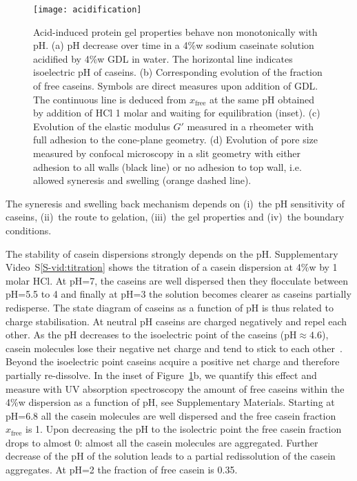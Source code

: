 \documentclass[twocolumn,superscriptaddress,showpacs,preprintnumbers, amsmath,amssymb,prl]{revtex4-1}
\begin{document}
\begin{figure}
	\texttt{[image: acidification]}%
	\caption{Acid-induced protein gel properties behave non monotonically with pH. (a) pH decrease over time in a 4\%w sodium caseinate solution acidified by 4\%w GDL in water. The horizontal line indicates isoelectric pH of caseins. (b) Corresponding evolution of the fraction of free caseins. Symbols are direct measures upon addition of GDL. The continuous line is deduced from $x_\text{free}$ at the same pH obtained by addition of HCl 1 molar and waiting for equilibration (inset). (c) Evolution of the elastic modulus $G'$ measured in a rheometer with full adhesion to the cone-plane geometry. (d) Evolution of pore size measured by confocal microscopy in a slit geometry with either adhesion to all walls (black line) or no adhesion to top wall, i.e. allowed syneresis and swelling (orange dashed line).}%
	\label{fig:acidification}
\end{figure}


The syneresis and swelling back mechanism depends on (i)~the pH sensitivity of caseins, (ii)~the route to gelation, (iii)~the gel properties and (iv)~the boundary conditions.

The stability of casein dispersions strongly depends on the pH. Supplementary Video~S\ref{S-vid:titration} shows the titration of a casein dispersion at 4\%w by 1 molar HCl. At pH=7, the caseins are well dispersed then they flocculate between pH=5.5 to 4 and finally at pH=3 the solution becomes clearer as caseins partially redisperse. The state diagram of caseins as a function of pH is thus related to charge stabilisation. At neutral pH caseins are charged negatively and repel each other. As the pH decreases to the isoelectric point of the caseins (pH$\approx 4.6$), casein molecules lose their negative net charge and tend to stick to each other~\cite{Roefs1986,Bremer1989,Lucey1998,Dickinson2002}. Beyond the isoelectric point caseins acquire a positive net charge and therefore partially re-dissolve. In the inset of Figure~\ref{fig:acidification}b, we quantify this effect and measure with UV absorption spectroscopy the amount of free caseins within the 4\%w dispersion as a function of pH, see Supplementary Materials. Starting at pH=6.8 all the casein molecules are well dispersed and the free casein fraction $x_\text{free}$ is 1. Upon decreasing the pH to the isolectric point the free casein fraction drops to almost 0: almost all the casein molecules are aggregated. Further decrease of the pH of the solution leads to a partial redissolution of the casein aggregates. At pH=2 the fraction of free casein is 0.35.
\end{document}

